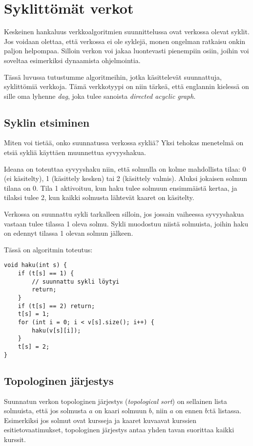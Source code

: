 \chapter{Syklittömät verkot}

Keskeinen hankaluus verkkoalgoritmien suunnittelussa ovat
verkossa olevat syklit.
Jos voidaan olettaa, että verkossa ei ole syklejä,
monen ongelman ratkaisu onkin paljon helpompaa.
Silloin verkon voi jakaa luontevasti pienempiin osiin,
joihin voi soveltaa esimerkiksi dynaamista ohjelmointia.

Tässä luvussa tutustumme algoritmeihin,
jotka käsittelevät suunnattuja, syklittömiä verkkoja.
Tämä verkkotyypi on niin tärkeä, että englannin kielessä
on sille oma lyhenne \textit{dag},
joka tulee sanoista \textit{directed acyclic graph}.

\section{Syklin etsiminen}

Miten voi tietää, onko suunnatussa verkossa
sykliä?
Yksi tehokas menetelmä on etsiä
sykliä käyttäen muunnettua syvyyshakua.

Ideana on toteuttaa syvyyshaku niin,
että solmulla on kolme mahdollista tilaa:
0 (ei käsitelty),
1 (käsittely kesken) tai
2 (käsittely valmis).
Aluksi jokaisen solmun tilana on 0.
Tila 1 aktivoituu,
kun haku tulee solmuun ensimmäistä kertaa,
ja tilaksi tulee 2,
kun kaikki solmusta lähtevät kaaret
on käsitelty.

Verkossa on suunnattu sykli tarkalleen silloin,
jos jossain vaiheessa syvyyshakua vastaan
tulee tilassa 1 oleva solmu.
Sykli muodostuu niistä solmuista,
joihin haku on edennyt tilassa 1
olevan solmun jälkeen.

Tässä on algoritmin toteutus:

\begin{lstlisting}
void haku(int s) {
    if (t[s] == 1) {
        // suunnattu sykli löytyi
        return;
    }
    if (t[s] == 2) return;
    t[s] = 1;
    for (int i = 0; i < v[s].size(); i++) {
        haku(v[s][i]);
    }
    t[s] = 2;
}
\end{lstlisting}

\section{Topologinen järjestys}

Suunnatun verkon topologinen järjestys
(\textit{topological sort}) on
sellainen lista solmuista,
että jos solmusta $a$ on kaari solmuun $b$,
niin $a$ on ennen $b$:tä listassa.
Esimerkiksi jos solmut ovat kursseja
ja kaaret kuvaavat kurssien esitietovaatimukset,
topologinen järjestys antaa yhden
tavan suorittaa kaikki kurssit.

